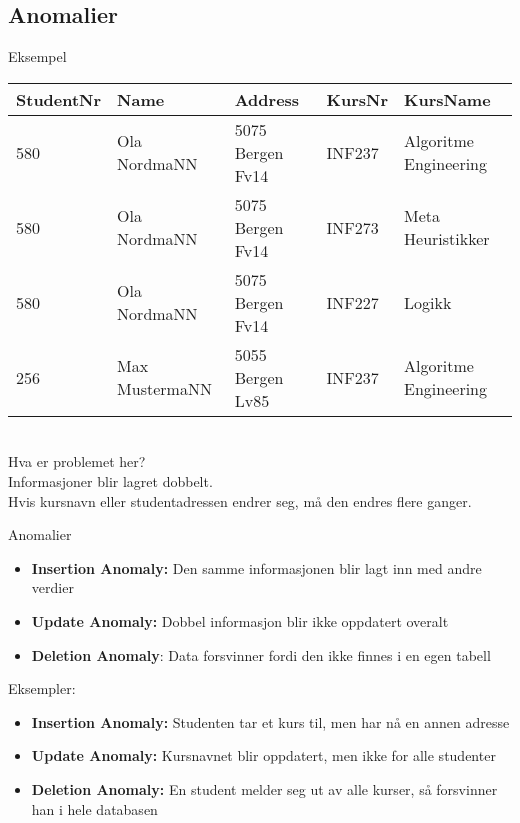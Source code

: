 \subsection*{Anomalier}
\begin{frame}{Eksempel}
\begin{tabular}{l|l|l|l|l}
 StudentNr & Name & Address & KursNr & KursName \\\hline
 580 & Ola NordmaNN & 5075 Bergen Fv14 & INF237 & Algoritme Engineering\\
 580 & Ola NordmaNN & 5075 Bergen Fv14 & INF273 & Meta Heuristikker\\
 580 & Ola NordmaNN & 5075 Bergen Fv14 & INF227 & Logikk\\
 256 & Max MustermaNN & 5055 Bergen Lv85 & INF237 & Algoritme Engineering\\
\end{tabular}
\\[5mm]
Hva er problemet her?\\\pause
Informasjoner blir lagret dobbelt.\\
Hvis kursnavn eller studentadressen endrer seg, må den endres flere ganger.
\end{frame}

\begin{frame}{Anomalier}
\begin{itemize}[<+->]
    \item \textbf{Insertion Anomaly:} Den samme informasjonen blir lagt inn med andre verdier
    \item \textbf{Update Anomaly:} Dobbel informasjon blir ikke oppdatert overalt
    \item \textbf{Deletion Anomaly}: Data forsvinner fordi den ikke finnes i en egen tabell
\end{itemize}

\pause

\medskip

Eksempler:
\begin{itemize}[<+->]
    \item \textbf{Insertion Anomaly:} Studenten tar et kurs til, men har nå en annen adresse 
    \item \textbf{Update Anomaly:} Kursnavnet blir oppdatert, men ikke for alle studenter
    \item \textbf{Deletion Anomaly:} En student melder seg ut av alle kurser, så forsvinner han i hele databasen
\end{itemize}
\end{frame}

